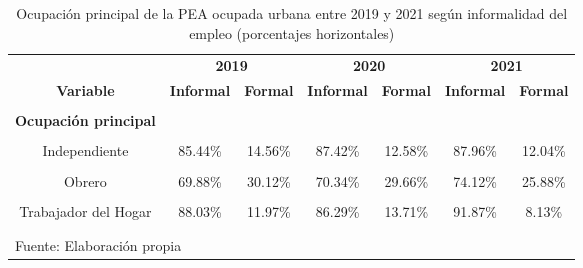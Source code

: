 \documentclass[
  letterpaper,
  12pt,
  oneside,
  spanish,
  doublespacing,
  headsepline,
  parskip]{MastersDoctoralThesis}
\begin{document}
\hypertarget{tbl-ocupi}{}
\begin{table}[H]
\caption{\label{tbl-ocupi}Ocupación principal de la PEA ocupada urbana entre 2019 y 2021 según
informalidad del empleo (porcentajes horizontales) }\tabularnewline

\centering\begingroup\fontsize{10}{12}\selectfont

\begin{tabular}{ccccccc}
\toprule
\multicolumn{1}{c}{ } & \multicolumn{2}{c}{\textbf{2019}} & \multicolumn{2}{c}{\textbf{2020}} & \multicolumn{2}{c}{\textbf{2021}} \\
\cmidrule(l{3pt}r{3pt}){2-3} \cmidrule(l{3pt}r{3pt}){4-5} \cmidrule(l{3pt}r{3pt}){6-7}
\textbf{Variable} & \textbf{Informal} & \textbf{Formal} & \textbf{Informal} & \textbf{Formal} & \textbf{Informal} & \textbf{Formal}\\
\midrule
\cellcolor{gray!6}{\textbf{Nacional}} & \cellcolor{gray!6}{66.40\%} & \cellcolor{gray!6}{33.60\%} & \cellcolor{gray!6}{68.42\%} & \cellcolor{gray!6}{31.58\%} & \cellcolor{gray!6}{71.41\%} & \cellcolor{gray!6}{28.59\%}\\
\textbf{Ocupación principal} &  &  &  &  &  & \\
\cellcolor{gray!6}{Empleador} & \cellcolor{gray!6}{45.73\%} & \cellcolor{gray!6}{54.27\%} & \cellcolor{gray!6}{47.22\%} & \cellcolor{gray!6}{52.78\%} & \cellcolor{gray!6}{50.81\%} & \cellcolor{gray!6}{49.19\%}\\
Independiente & 85.44\% & 14.56\% & 87.42\% & 12.58\% & 87.96\% & 12.04\%\\
\cellcolor{gray!6}{Empleado} & \cellcolor{gray!6}{36.68\%} & \cellcolor{gray!6}{63.32\%} & \cellcolor{gray!6}{34.02\%} & \cellcolor{gray!6}{65.98\%} & \cellcolor{gray!6}{39.84\%} & \cellcolor{gray!6}{60.16\%}\\
\addlinespace
Obrero & 69.88\% & 30.12\% & 70.34\% & 29.66\% & 74.12\% & 25.88\%\\
\cellcolor{gray!6}{Familiar No Remunerado} & \cellcolor{gray!6}{100.00\%} & \cellcolor{gray!6}{0.00\%} & \cellcolor{gray!6}{100.00\%} & \cellcolor{gray!6}{0.00\%} & \cellcolor{gray!6}{100.00\%} & \cellcolor{gray!6}{0.00\%}\\
Trabajador del Hogar & 88.03\% & 11.97\% & 86.29\% & 13.71\% & 91.87\% & 8.13\%\\
\cellcolor{gray!6}{Otro} & \cellcolor{gray!6}{100.00\%} & \cellcolor{gray!6}{0.00\%} & \cellcolor{gray!6}{100.00\%} & \cellcolor{gray!6}{0.00\%} & \cellcolor{gray!6}{100.00\%} & \cellcolor{gray!6}{0.00\%}\\
\bottomrule
\multicolumn{7}{l}{\textsuperscript{} Fuente: Elaboración propia}\\
\end{tabular}
\endgroup{}
\end{table}
\end{document}
